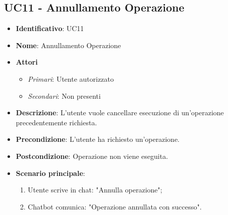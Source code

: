 \subsection{UC11 - Annullamento Operazione }
\begin{itemize}
	\item \textbf{Identificativo}: UC11
	\item \textbf{Nome}: Annullamento Operazione
	\item \textbf{Attori}
	\begin{itemize} 
		\item \textit{Primari}: Utente autorizzato
		\item \textit{Secondari}: Non presenti
	\end{itemize}
	\item \textbf{Descrizione}: L'utente vuole cancellare esecuzione di un'operazione precedentemente richiesta.
	\item \textbf{Precondizione}: L'utente ha richiesto un'operazione.
	\item \textbf{Postcondizione}: Operazione non viene eseguita.
	\item \textbf{Scenario principale}: \begin{enumerate}
		\item Utente scrive in chat: "Annulla operazione";
		\item Chatbot comunica: "Operazione annullata con successo".
	\end{enumerate}
\end{itemize}